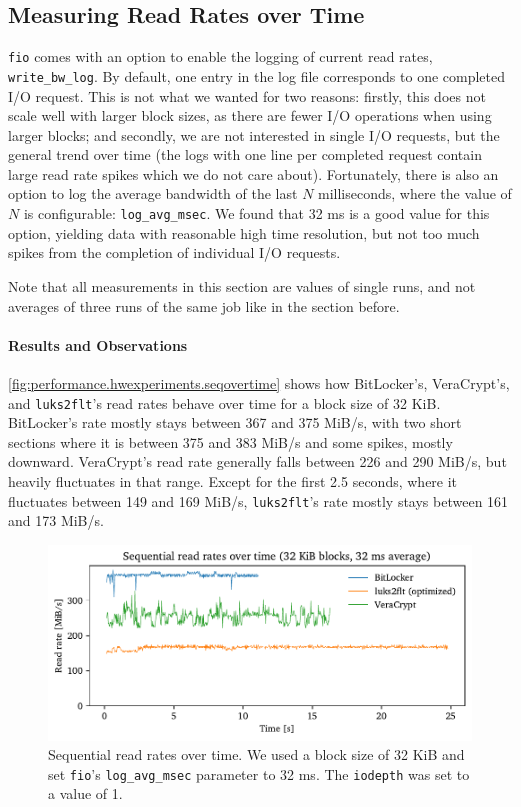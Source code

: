 \subsection{Measuring Read Rates over Time}
\label{chap:performance.hwexperiments.readrateovertime}
\texttt{fio} comes with an option to enable the logging of current read rates, \texttt{write\_bw\_log}. By default, one entry in the log file corresponds to one completed I/O request. This is not what we wanted for two reasons: firstly, this does not scale well with larger block sizes, as there are fewer I/O operations when using larger blocks; and secondly, we are not interested in single I/O requests, but the general trend over time (the logs with one line per completed request contain large read rate spikes which we do not care about). Fortunately, there is also an option to log the average bandwidth of the last $N$ milliseconds, where the value of $N$ is configurable: \texttt{log\_avg\_msec}. We found that 32 ms is a good value for this option, yielding data with reasonable high time resolution, but not too much spikes from the completion of individual I/O requests.

Note that all measurements in this section are values of single runs, and not averages of three runs of the same job like in the section before.

\paragraph{Results and Observations}
\autoref{fig:performance.hwexperiments.seqovertime} shows how BitLocker's, VeraCrypt's, and \texttt{luks2flt}'s read rates behave over time for a block size of 32 KiB. BitLocker's rate mostly stays between 367 and 375 MiB/s, with two short sections where it is between 375 and 383 MiB/s and some spikes, mostly downward. VeraCrypt's read rate generally falls between 226 and 290 MiB/s, but heavily fluctuates in that range. Except for the first 2.5 seconds, where it fluctuates between 149 and 169 MiB/s, \texttt{luks2flt}'s rate mostly stays between 161 and 173 MiB/s.

\begin{figure}[htb!]
	\center
	\includegraphics[scale=1]{../fig/performance.hwexperiments.seqovertime.pdf}
	\caption[
		Sequential read rates over time
	]{
		Sequential read rates over time. We used a block size of 32 KiB and set \texttt{fio}'s \texttt{log\_avg\_msec} parameter to 32 ms. The \texttt{iodepth} was set to a value of 1.
	}
	\label{fig:performance.hwexperiments.seqovertime}
\end{figure}

